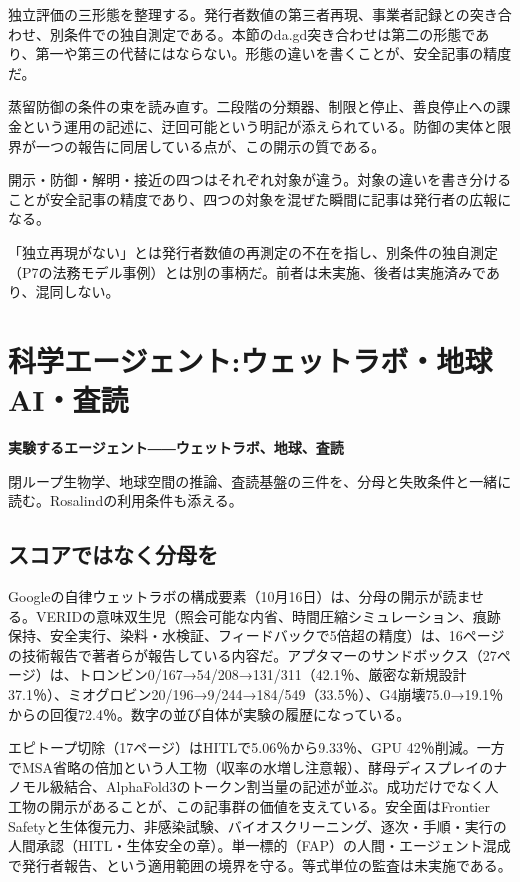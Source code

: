 \documentclass[lualatex,a4paper,10pt]{jlreq}
\begin{document}
独立評価の三形態を整理する。発行者数値の第三者再現、事業者記録との突き合わせ、別条件での独自測定である。本節のda.gd突き合わせは第二の形態であり、第一や第三の代替にはならない。形態の違いを書くことが、安全記事の精度だ。
\cite{B40,B79}


蒸留防御の条件の束を読み直す。二段階の分類器、制限と停止、善良停止への課金という運用の記述に、迂回可能という明記が添えられている。防御の実体と限界が一つの報告に同居している点が、この開示の質である。
\cite{B41,B80}


開示・防御・解明・接近の四つはそれぞれ対象が違う。対象の違いを書き分けることが安全記事の精度であり、四つの対象を混ぜた瞬間に記事は発行者の広報になる。
\cite{B40,B79,B41,B80,B42,B81,B39,B82}


「独立再現がない」とは発行者数値の再測定の不在を指し、別条件の独自測定（P7の法務モデル事例）とは別の事柄だ。前者は未実施、後者は実施済みであり、混同しない。


\FloatBarrier %
\section{科学エージェント:ウェットラボ・地球AI・査読}
\label{sec:P6}

{\Large\bfseries 実験するエージェント――ウェットラボ、地球、査読\par}
\smallskip
{\color{SurveyMuted}閉ループ生物学、地球空間の推論、査読基盤の三件を、分母と失敗条件と一緒に読む。Rosalindの利用条件も添える。\par}
\bigskip

\subsection*{スコアではなく分母を}

Googleの自律ウェットラボの構成要素（10月16日）は、分母の開示が読ませる。VERIDの意味双生児（照会可能な内省、時間圧縮シミュレーション、痕跡保持、安全実行、染料・水検証、フィードバックで5倍超の精度）は、16ページの技術報告で著者らが報告している内容だ。アプタマーのサンドボックス（27ページ）は、トロンビン0/167→54/208→131/311（42.1％、厳密な新規設計37.1％）、ミオグロビン20/196→9/244→184/549（33.5％）、G4崩壊75.0→19.1％からの回復72.4％。数字の並び自体が実験の履歴になっている。
\cite{B46,B83,B44,B43,B45}


エピトープ切除（17ページ）はHITLで5.06％から9.33％、GPU 42％削減。一方でMSA省略の倍加という人工物（収率の水増し注意報）、酵母ディスプレイのナノモル級結合、AlphaFold3のトークン割当量の記述が並ぶ。成功だけでなく人工物の開示があることが、この記事群の価値を支えている。安全面はFrontier Safetyと生体復元力、非感染試験、バイオスクリーニング、逐次・手順・実行の人間承認（HITL・生体安全の章）。単一標的（FAP）の人間・エージェント混成で発行者報告、という適用範囲の境界を守る。等式単位の監査は未実施である。
\cite{B46,B83,B44,B43,B45}
\end{document}
